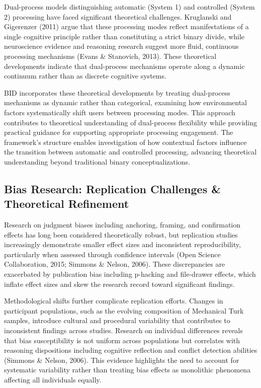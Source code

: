\documentclass[
  authoryear,
  preprint]{elsarticle}
\begin{document}
Dual-process models distinguishing automatic (System 1) and controlled
(System 2) processing have faced significant theoretical challenges.
Kruglanski and Gigerenzer (2011) argue that these processing modes
reflect manifestations of a single cognitive principle rather than
constituting a strict binary divide, while neuroscience evidence and
reasoning research suggest more fluid, continuous processing mechanisms
(Evans \& Stanovich, 2013). These theoretical developments indicate that
dual-process mechanisms operate along a dynamic continuum rather than as
discrete cognitive systems.

BID incorporates these theoretical developments by treating dual-process
mechanisms as dynamic rather than categorical, examining how
environmental factors systematically shift users between processing
modes. This approach contributes to theoretical understanding of
dual-process flexibility while providing practical guidance for
supporting appropriate processing engagement. The framework's structure
enables investigation of how contextual factors influence the transition
between automatic and controlled processing, advancing theoretical
understanding beyond traditional binary conceptualizations.

\subsection{Bias Research: Replication Challenges \& Theoretical
Refinement}\label{bias-research-replication-challenges-theoretical-refinement}

Research on judgment biases including anchoring, framing, and
confirmation effects has long been considered theoretically robust, but
replication studies increasingly demonstrate smaller effect sizes and
inconsistent reproducibility, particularly when assessed through
confidence intervals (Open Science Collaboration, 2015; Simmons \&
Nelson, 2006). These discrepancies are exacerbated by publication bias
including p-hacking and file-drawer effects, which inflate effect sizes
and skew the research record toward significant findings.

Methodological shifts further complicate replication efforts. Changes in
participant populations, such as the evolving composition of Mechanical
Turk samples, introduce cultural and procedural variability that
contributes to inconsistent findings across studies. Research on
individual differences reveals that bias susceptibility is not uniform
across populations but correlates with reasoning dispositions including
cognitive reflection and conflict detection abilities (Simmons \&
Nelson, 2006). This evidence highlights the need to account for
systematic variability rather than treating bias effects as monolithic
phenomena affecting all individuals equally.
\end{document}
